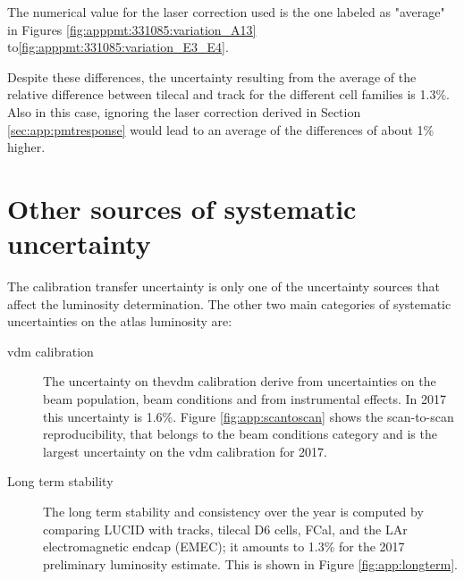 \noindent The numerical value for the laser correction used is the one labeled as "average" in Figures \ref{fig:apppmt:331085:variation_A13}
 to\ref{fig:apppmt:331085:variation_E3_E4}. 

Despite these differences, the uncertainty resulting from the average of the relative difference between 
\gls{tilecal} and track for the different cell families is 1.3\%. Also in this case, ignoring the laser correction derived in 
Section \ref{sec:app:pmtresponse} would lead to an average of the differences of about 1\% higher. 

\FloatBarrier

\section{Other sources of systematic uncertainty}

The calibration transfer uncertainty is only one of the uncertainty sources that affect the luminosity determination. 
The other two main categories of systematic uncertainties on the \gls{atlas} luminosity are:
\begin{description}
\item[\gls{vdm} calibration] The uncertainty on the\gls{vdm} calibration derive from uncertainties on the 
beam population, beam conditions and from instrumental effects. In 2017 this uncertainty is 1.6\%. 
Figure \ref{fig:app:scantoscan} shows the scan-to-scan reproducibility, that belongs to the beam conditions category 
and is the largest uncertainty on the \gls{vdm} calibration for 2017.   
\item[Long term stability] The long term stability and consistency over the year is computed by comparing LUCID with
 tracks, \gls{tilecal} D6 cells, FCal, and the LAr electromagnetic endcap (EMEC); 
 it amounts to 1.3\% for the 2017 preliminary 
luminosity estimate. This is shown in Figure \ref{fig:app:longterm}.
\end{description}

